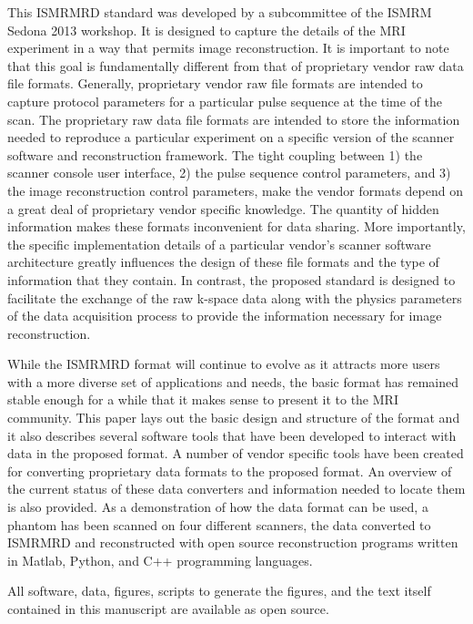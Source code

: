 \documentclass[12pt]{article}
\begin{document}
This ISMRMRD standard was developed by a subcommittee of the ISMRM Sedona 2013 workshop.  It is designed to capture the details of the MRI experiment in a way that permits image reconstruction.  It is important to note that this goal is fundamentally different from that of proprietary vendor raw data file formats.  Generally, proprietary vendor raw file formats are intended to capture protocol parameters for a particular pulse sequence at the time of the scan.  The proprietary raw data file formats are intended to store the information needed to reproduce a particular experiment on a specific version of the scanner software and reconstruction framework.  The tight coupling between 1) the scanner console user interface, 2) the pulse sequence control parameters, and 3) the image reconstruction control parameters, make the vendor formats depend on a great deal of proprietary vendor specific knowledge. The quantity of hidden information makes these formats inconvenient for data sharing.  More importantly, the specific implementation details of a particular vendor's scanner software architecture greatly influences the design of these file formats and the type of information that they contain.  In contrast, the proposed standard is designed to facilitate the exchange of the raw k-space data along with the physics parameters of the data acquisition process to provide the information necessary for image reconstruction.

While the ISMRMRD format will continue to evolve as it attracts more users with a more diverse set of applications and needs, the basic format has remained stable enough for a while that it makes sense to present it to the MRI community. This paper lays out the basic design and structure of the format and it also describes several software tools that have been developed to interact with data in the proposed format. A number of vendor specific tools have been created for converting proprietary data formats to the proposed format. An overview of the current status of these data converters and information needed to locate them is also provided. As a demonstration of how the data format can be used, a phantom has been scanned on four different scanners, the data converted to ISMRMRD and reconstructed with open source reconstruction programs written in Matlab, Python, and C++ programming languages. 

All software, data, figures, scripts to generate the figures, and the text itself contained in this manuscript are available as open source. 
\end{document}
